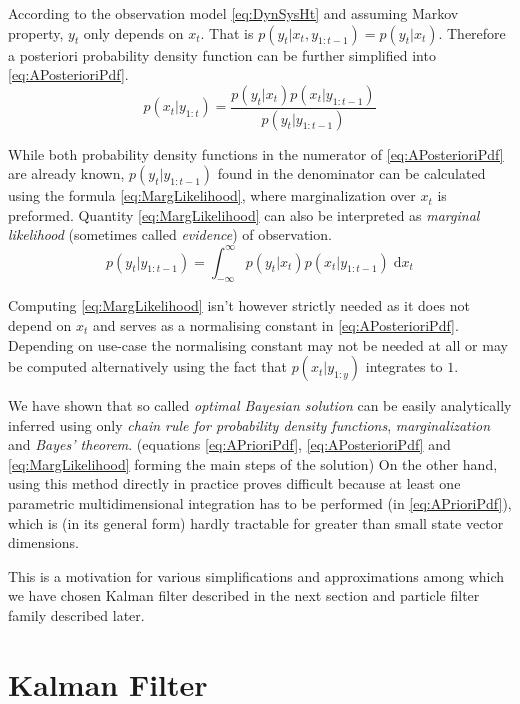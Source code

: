 \documentclass[a4paper,12pt,oneside]{report}
\newcommand{\pdf}{probability density function}
\newcommand{\pdfs}{probability density functions}
\begin{document}
According to the observation model \eqref{eq:DynSysHt} and assuming Markov property, \(y_t\) only
depends on \(x_t\). That is \(p(y_t | x_t, y_{1:t-1}) = p(y_t | x_t)\). Therefore a posteriori
{\pdf} can be further simplified into \eqref{eq:APosterioriPdf}.
\begin{equation} \label{eq:APosterioriPdf}
	p(x_t | y_{1:t}) = \frac{p(y_t | x_t) p(x_t | y_{1:t-1})}{p(y_t | y_{1:t-1})}
\end{equation}

While both {\pdfs} in the numerator of \eqref{eq:APosterioriPdf} are already known, \(p(y_t|y_{1:t-1})\)
found in the denominator can be calculated using the formula \eqref{eq:MargLikelihood}, where
marginalization over \(x_t\) is preformed. Quantity \eqref{eq:MargLikelihood} can also be interpreted as
\emph{marginal likelihood} (sometimes called \emph{evidence}) of observation.~\cite{Smi:10}
\begin{equation} \label{eq:MargLikelihood}
	p(y_t | y_{1:t-1}) = \int_{-\infty}^{\infty} p(y_t | x_t) p(x_t | y_{1:t-1}) \; \mathrm{d} x_{t}
\end{equation}

Computing \eqref{eq:MargLikelihood} isn't however strictly needed as it does not depend on \(x_t\) and
serves as a normalising constant in \eqref{eq:APosterioriPdf}. Depending on use-case the normalising
constant may not be needed at all or may be computed alternatively using the fact that \(p(x_t | y_{1:y})\)
integrates to \(1\).

We have shown that so called \emph{optimal Bayesian solution}\cite{AruMasGor:02} can be easily
analytically inferred using only \emph{chain rule for {\pdfs}}, \emph{marginalization} and
\emph{Bayes' theorem}. (equations \eqref{eq:APrioriPdf}, \eqref{eq:APosterioriPdf} and
\eqref{eq:MargLikelihood} forming the main steps of the solution) On the other hand, using this
method directly in practice proves difficult because at least one parametric multidimensional
integration has to be performed (in \eqref{eq:APrioriPdf}), which is (in its general form) hardly
tractable for greater than small state vector dimensions.

This is a motivation for various simplifications and approximations among which we have chosen
Kalman filter described in the next section and particle filter family described later.

\section{Kalman Filter}
\end{document}
